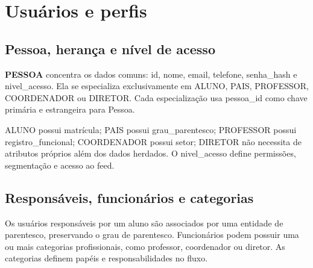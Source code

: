 \section{Usuários e perfis}
\subsection{Pessoa, herança e nível de acesso}
\textbf{PESSOA} concentra os dados comuns: id, nome, email, telefone, senha\_hash e nivel\_acesso. Ela se especializa exclusivamente em ALUNO, PAIS, PROFESSOR, COORDENADOR ou DIRETOR. Cada especialização usa pessoa\_id como chave primária e estrangeira para Pessoa.

ALUNO possui matrícula; PAIS possui grau\_parentesco; PROFESSOR possui registro\_funcional; COORDENADOR possui setor; DIRETOR não necessita de atributos próprios além dos dados herdados. O nivel\_acesso define permissões, segmentação e acesso ao feed.

\subsection{Responsáveis, funcionários e categorias}
Os usuários responsáveis por um aluno são associados por uma entidade de parentesco, preservando o grau de parentesco. Funcionários podem possuir uma ou mais categorias profissionais, como professor, coordenador ou diretor. As categorias definem papéis e responsabilidades no fluxo.
